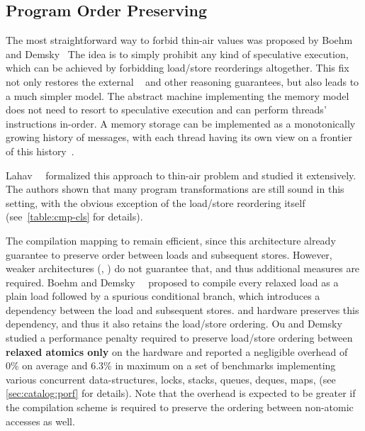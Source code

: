 \subsection{Program Order Preserving}
\label{sec:analysis:porf}

The most straightforward way to forbid thin-air values 
was proposed by Boehm and Demsky~\cite{Boehm-Demsky:MSPC14}
The idea is to simply prohibit any kind of speculative execution, 
which can be achieved by forbidding load/store reorderings altogether. 
This fix not only restores the external \DRF~\cite{Lahav-al:PLDI17}
and other reasoning guarantees, but also leads to 
a much simpler model. The abstract machine implementing 
the memory model does not need to resort to speculative execution 
and can perform threads' instructions in-order. 
A memory storage can be implemented as a 
monotonically growing history of messages, 
with each thread having its own view on 
a frontier of this history~\cite{Dolan-al:PLDI18, Doherty-al:PPoPP19}.

Lahav~\etal~\cite{Lahav-al:PLDI17} formalized this approach
to thin-air problem and studied it extensively. 
The authors shown that many program transformations 
are still sound in this setting, 
with the obvious exception of the load/store reordering itself
(see~\cref{table:cmp-cls} for details).

The compilation mapping to \Intel remain efficient, 
since this architecture already guarantee to preserve order 
between loads and subsequent stores. 
However, weaker architectures (\ARM, \POWER) do not guarantee that, 
and thus additional measures are required.
Boehm and Demsky~\etal~\cite{Boehm-Demsky:MSPC14} proposed to 
compile every relaxed load as 
a plain load followed by a spurious conditional branch,
which introduces a dependency between 
the load and subsequent stores. 
\ARM and \POWER hardware preserves this dependency, 
and thus it also retains the load/store ordering. 
Ou and Demsky~\cite{Ou-Demsky:OOPSLA18} studied 
a performance penalty required to preserve
load/store ordering between \textbf{relaxed atomics only}
on the  hardware and reported a negligible overhead
of 0\% on average and 6.3\% in maximum on a set of benchmarks
implementing various concurrent data-structures, 
\eg locks, stacks, queues, deques, maps, \etc 
(see \ref{sec:catalog:porf} for details).
Note that the overhead is expected to be greater 
if the compilation scheme is required to preserve the ordering 
between non-atomic accesses as well. 

